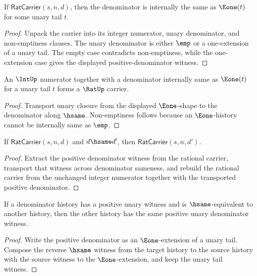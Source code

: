 \begin{theorem}
\label{thm:rat-carrier-positive-denominator}
If \(\mathsf{RatCarrier}(s,n,d)\), then the denominator is internally the same as \(\Eone(t)\) for some unary tail \(t\).
\end{theorem}
\begin{proof}
Unpack the carrier into its integer numerator, unary denominator, and non-emptiness clauses. The unary denominator is either \(\emp\) or a one-extension of a unary tail. The empty case contradicts non-emptiness, while the one-extension case gives the displayed positive-denominator witness.
\end{proof}

\begin{theorem}
\label{thm:rat-carrier-from-positive-denominator}
An \(\IntUp\) numerator together with a denominator internally same as
\(\Eone(t)\) for a unary tail \(t\) forms a \(\RatUp\) carrier.
\end{theorem}
\begin{proof}
Transport unary closure from the displayed \(\Eone\)-shape to the denominator
along \(\hsame\). Non-emptiness follows because an \(\Eone\)-history cannot be
internally same as \(\emp\).
\end{proof}

\begin{theorem}
\label{thm:rat-carrier-denominator-hsame-transport}
If \(\mathsf{RatCarrier}(s,n,d)\) and \(d\hsame d'\), then
\(\mathsf{RatCarrier}(s,n,d')\).
\end{theorem}
\begin{proof}
Extract the positive denominator witness from the rational carrier, transport
that witness across denominator sameness, and rebuild the rational carrier from
the unchanged integer numerator together with the transported positive
denominator.
\end{proof}

\begin{theorem}
\label{thm:rat-positive-unary-denominator-hsame-transport}
If a denominator history has a positive unary witness and is \(\hsame\)-equivalent to another history, then the other history has the same positive unary denominator witness.
\end{theorem}
\begin{proof}
Write the positive denominator as an \(\Eone\)-extension of a unary tail. Compose the reverse \(\hsame\) witness from the target history to the source history with the source witness to the \(\Eone\)-extension, and keep the unary tail witness.
\end{proof}

